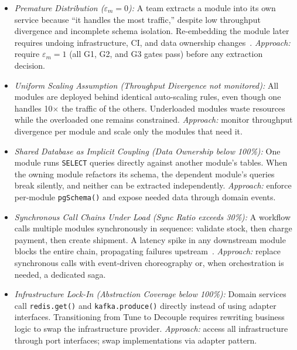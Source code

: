 \begin{itemize}[itemsep=8pt,topsep=2pt]
  \item \emph{Premature Distribution ($\varepsilon_m = 0$):}
  A team extracts a module into its own service because ``it handles the most traffic,'' despite low throughput divergence and incomplete schema isolation. Re-embedding the module later requires undoing infrastructure, CI, and data ownership changes~\cite{gravanis2021dont, su2024from}.
  \emph{Approach:} require $\varepsilon_m = 1$ (all G1, G2, and G3 gates pass) before any extraction decision.

  \item \emph{Uniform Scaling Assumption (Throughput Divergence not monitored):}
  All modules are deployed behind identical auto-scaling rules, even though one handles 10$\times$ the traffic of the others. Underloaded modules waste resources while the overloaded one remains constrained.
  \emph{Approach:} monitor throughput divergence per module and scale only the modules that need it.

  \item \emph{Shared Database as Implicit Coupling (Data Ownership below 100\%):}
  One module runs \texttt{SELECT} queries directly against another module's tables. When the owning module refactors its schema, the dependent module's queries break silently, and neither can be extracted independently.
  \emph{Approach:} enforce per-module \texttt{pgSchema()} and expose needed data through domain events.

  \item \emph{Synchronous Call Chains Under Load (Sync Ratio exceeds 30\%):}
  A workflow calls multiple modules synchronously in sequence: validate stock, then charge payment, then create shipment. A latency spike in any downstream module blocks the entire chain, propagating failures upstream~\cite{newman2019monolith}.
  \emph{Approach:} replace synchronous calls with event-driven choreography or, when orchestration is needed, a dedicated saga.

  \item \emph{Infrastructure Lock-In (Abstraction Coverage below 100\%):}
  Domain services call \texttt{redis.get()} and \texttt{kafka.produce()} directly instead of using adapter interfaces. Transitioning from Tune to Decouple requires rewriting business logic to swap the infrastructure provider.
  \emph{Approach:} access all infrastructure through port interfaces; swap implementations via adapter pattern.
\end{itemize}

